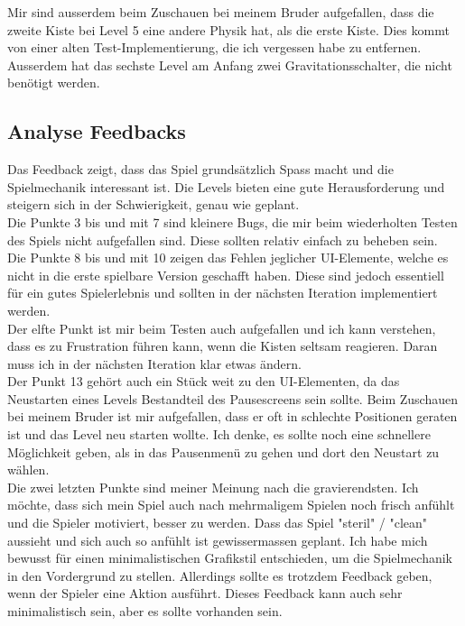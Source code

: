 \documentclass{article}
\begin{document}
\bigskip
Mir sind ausserdem beim Zuschauen bei meinem Bruder aufgefallen, dass die zweite Kiste bei Level 5 eine andere Physik hat, als die erste Kiste. Dies kommt von einer
alten Test-Implementierung, die ich vergessen habe zu entfernen. Ausserdem hat das sechste Level am Anfang zwei Gravitationsschalter, die nicht benötigt werden.

\subsection{Analyse Feedbacks}

Das Feedback zeigt, dass das Spiel grundsätzlich Spass macht und die Spielmechanik interessant ist. Die Levels bieten eine gute Herausforderung
und steigern sich in der Schwierigkeit, genau wie geplant.
\\
Die Punkte 3 bis und mit 7 sind kleinere Bugs, die mir beim wiederholten Testen des Spiels nicht aufgefallen sind. Diese sollten relativ einfach zu beheben sein.
\\
Die Punkte 8 bis und mit 10 zeigen das Fehlen jeglicher UI-Elemente, welche es nicht in die erste spielbare Version geschafft haben. Diese sind jedoch
essentiell für ein gutes Spielerlebnis und sollten in der nächsten Iteration implementiert werden.
\\
Der elfte Punkt ist mir beim Testen auch aufgefallen und ich kann verstehen, dass es zu Frustration führen kann, wenn die Kisten seltsam reagieren. Daran muss
ich in der nächsten Iteration klar etwas ändern.
\\
Der Punkt 13 gehört auch ein Stück weit zu den UI-Elementen, da das Neustarten eines Levels Bestandteil des Pausescreens sein sollte. Beim Zuschauen bei meinem Bruder
ist mir aufgefallen, dass er oft in schlechte Positionen geraten ist und das Level neu starten wollte. Ich denke, es sollte noch eine schnellere Möglichkeit geben,
als in das Pausenmenü zu gehen und dort den Neustart zu wählen.
\\
Die zwei letzten Punkte sind meiner Meinung nach die gravierendsten. Ich möchte, dass sich mein Spiel auch nach mehrmaligem Spielen noch frisch anfühlt und die Spieler
motiviert, besser zu werden. Dass das Spiel "steril" / "clean" aussieht und sich auch so anfühlt ist gewissermassen geplant. Ich habe mich bewusst für einen minimalistischen
Grafikstil entschieden, um die Spielmechanik in den Vordergrund zu stellen. Allerdings sollte es trotzdem Feedback geben, wenn der Spieler eine Aktion ausführt. Dieses
Feedback kann auch sehr minimalistisch sein, aber es sollte vorhanden sein.
\end{document}
